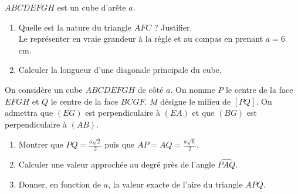 \begin{exo}$ABCDEFGH$ est un cube d'arête $a$.
\begin{enumerate}
	\item Quelle est la nature du triangle $AFC$ ? Justifier. \\
	Le représenter en vraie grandeur à la règle et au compas en prenant $a = 6$ cm.
	\item Calculer la longueur d'une diagonale principale du cube.
\end{enumerate}
\end{exo}

\sautpage

\begin{exo}
On considère un cube $ABCDEFGH$ de côté $a$.
On nomme $P$ le centre de la face $EFGH$ et $Q$ le centre de la face $BCGF$.
$M$ désigne le milieu de $[PQ]$.
On admettra que $(EG)$ est perpendiculaire à $(EA)$ et que $(BG)$ est perpendiculaire à $(AB)$.
\begin{enumerate}
	\item Montrer que $PQ=\frac{a\sqrt{2}}{2}$ puis que $AP=AQ=\frac{a\sqrt{6}}{2}$.
	\item Calculer une valeur approchée au degré près de l'angle $\widehat{PAQ}$.
	\item Donner, en fonction de $a$, la valeur exacte de l'aire du triangle $APQ$.
\end{enumerate}
\end{exo}

